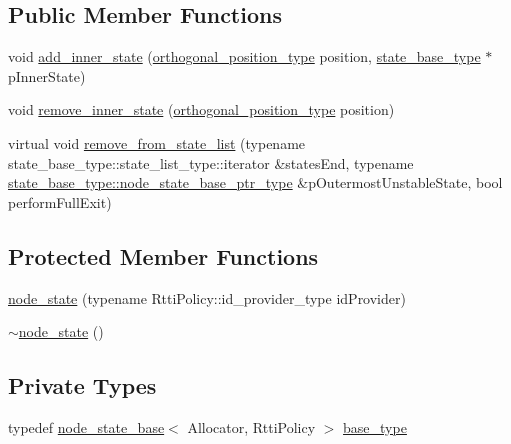 \subsection*{Public Member Functions}
\begin{DoxyCompactItemize}
\item 
void \mbox{\hyperlink{classboost_1_1statechart_1_1detail_1_1node__state_a69765d54be1730efeb31133a3828ff16}{add\+\_\+inner\+\_\+state}} (\mbox{\hyperlink{namespaceboost_1_1statechart_1_1detail_a3bedea0b807a16fa222733417183d2c9}{orthogonal\+\_\+position\+\_\+type}} position, \mbox{\hyperlink{classboost_1_1statechart_1_1detail_1_1node__state__base_a2b7ddb7642a5452045d9448444426735}{state\+\_\+base\+\_\+type}} $\ast$p\+Inner\+State)
\item 
void \mbox{\hyperlink{classboost_1_1statechart_1_1detail_1_1node__state_ab1c9cbc3ca4599a9f1633cb93cebd385}{remove\+\_\+inner\+\_\+state}} (\mbox{\hyperlink{namespaceboost_1_1statechart_1_1detail_a3bedea0b807a16fa222733417183d2c9}{orthogonal\+\_\+position\+\_\+type}} position)
\item 
virtual void \mbox{\hyperlink{classboost_1_1statechart_1_1detail_1_1node__state_a1022b2fe0c4ea5f8b47d6fd1fb7e7ffb}{remove\+\_\+from\+\_\+state\+\_\+list}} (typename state\+\_\+base\+\_\+type\+::state\+\_\+list\+\_\+type\+::iterator \&states\+End, typename \mbox{\hyperlink{classboost_1_1statechart_1_1detail_1_1state__base_a8e3dd0f80bf95d7df21417a50f1dbaa1}{state\+\_\+base\+\_\+type\+::node\+\_\+state\+\_\+base\+\_\+ptr\+\_\+type}} \&p\+Outermost\+Unstable\+State, bool perform\+Full\+Exit)
\end{DoxyCompactItemize}
\subsection*{Protected Member Functions}
\begin{DoxyCompactItemize}
\item 
\mbox{\hyperlink{classboost_1_1statechart_1_1detail_1_1node__state_ac0adf39c0e3b92be15801f8d25bf4996}{node\+\_\+state}} (typename Rtti\+Policy\+::id\+\_\+provider\+\_\+type id\+Provider)
\item 
\mbox{\hyperlink{classboost_1_1statechart_1_1detail_1_1node__state_a50990fc8652671fc112570393c2d3204}{$\sim$node\+\_\+state}} ()
\end{DoxyCompactItemize}
\subsection*{Private Types}
\begin{DoxyCompactItemize}
\item 
typedef \mbox{\hyperlink{classboost_1_1statechart_1_1detail_1_1node__state__base}{node\+\_\+state\+\_\+base}}$<$ Allocator, Rtti\+Policy $>$ \mbox{\hyperlink{classboost_1_1statechart_1_1detail_1_1node__state_a6ca25f58492e36e3a2a1b234925c5199}{base\+\_\+type}}
\end{DoxyCompactItemize}
